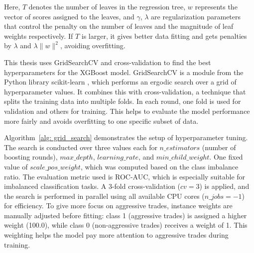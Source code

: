 Here, $T$ denotes the number of leaves in the regression tree, $w$ represents the vector of scores assigned to the leaves, and $\gamma$, $\lambda$ are regularization parameters that control the penalty on the number of leaves and the magnitude of leaf weights respectively. If $T$ is larger, it gives better data fitting and gets penalties by $\lambda$ and $\lambda \|w\|^2$, avoiding overfitting.

This thesis uses GridSearchCV and cross-validation to find the best hyperparameters for the XGBoost model. GridSearchCV is a module from the Python library scikit-learn \citep{scikit-learn2011}, which performs an ergodic search over a grid of hyperparameter values. It combines this with cross-validation, a technique that splits the training data into multiple folds. In each round, one fold is used for validation and others for training. This helps to evaluate the model performance more fairly and avoids overfitting to one specific subset of data. 

Algorithm~\ref{alg: grid_search} demonstrates the setup of hyperparameter tuning. The search is conducted over three values each for $n\_estimators$ (number of boosting rounds), $max\_depth$, $learning\_rate$, and $min\_child\_weight$. One fixed value of $scale\_pos\_weight$, which was computed based on the class imbalance ratio. The evaluation metric used is ROC-AUC, which is especially suitable for imbalanced classification tasks. A 3-fold cross-validation ($cv=3$) is applied, and the search is performed in parallel using all available CPU cores ($n\_jobs=-1$) for efficiency. To give more focus on aggressive trades, instance weights are manually adjusted before fitting: class 1 (aggressive trades) is assigned a higher weight (100.0), while class 0 (non-aggressive trades) receives a weight of 1. This weighting helps the model pay more attention to aggressive trades during training.

